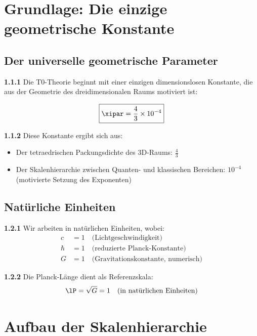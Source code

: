 	\section{Grundlage: Die einzige geometrische Konstante}
	
	\subsection{Der universelle geometrische Parameter}
	
	\noindent \textbf{1.1.1} Die T0-Theorie beginnt mit einer einzigen dimensionslosen Konstante, die aus der Geometrie des dreidimensionalen Raums motiviert ist:
	
	\begin{keyresult}
		\begin{equation}
			\boxed{\xipar = \frac{4}{3} \times 10^{-4}}
		\end{equation}
	\end{keyresult}
	
	\noindent \textbf{1.1.2} Diese Konstante ergibt sich aus:
	\begin{itemize}
		\item Der tetraedrischen Packungsdichte des 3D-Raums: $\frac{4}{3}$
		\item Der Skalenhierarchie zwischen Quanten- und klassischen Bereichen: $10^{-4}$ (motivierte Setzung des Exponenten)
	\end{itemize}
	
	\subsection{Natürliche Einheiten}
	
	\noindent \textbf{1.2.1} Wir arbeiten in natürlichen Einheiten, wobei:
	\begin{align}
		c &= 1 \quad \text{(Lichtgeschwindigkeit)} \\
		\hbar &= 1 \quad \text{(reduzierte Planck-Konstante)} \\
		G &= 1 \quad \text{(Gravitationskonstante, numerisch)}
	\end{align}
	
	\noindent \textbf{1.2.2} Die Planck-Länge dient als Referenzskala:
	\begin{equation}
		\lP = \sqrt{G} = 1 \quad \text{(in natürlichen Einheiten)}
	\end{equation}
	
	\section{Aufbau der Skalenhierarchie}
	
